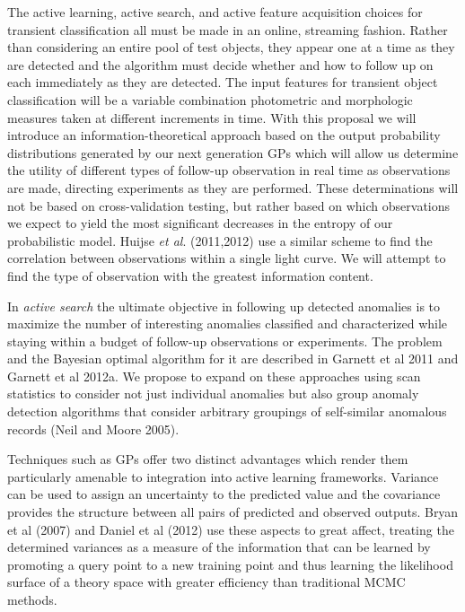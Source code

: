 \documentclass[prd,nofootbib,floatfix,11pt,tightenlines]{revtex4}
\begin{document}
The active learning, active search, and active feature
acquisition choices for transient classification
all must be made in an online, streaming fashion.  
Rather than
considering an entire pool of test objects, they appear one at a time as
they are detected and the algorithm must decide whether and how to follow
up on each immediately as they are detected. 
The input features for transient object classification will be 
a variable combination photometric
and morphologic measures taken at different increments in time. With
this proposal we will  introduce an information-theoretical approach 
based on the output probability distributions generated by our next generation GPs 
which will allow
us determine the utility of different types of follow-up observation
in real time as observations are made,
directing experiments as they are performed.
These determinations will not be based on cross-validation testing,
but rather based on which observations we expect to yield the most significant
decreases in the entropy of our probabilistic model.
Huijse {\it et al}. (2011,2012) use a similar scheme to find the correlation
between observations within a single light curve.  We will attempt to find
the type of observation with the greatest information content. 

In {\it active search} the ultimate objective in following up detected
anomalies is to maximize the number of interesting anomalies
classified and characterized while staying within a budget of
follow-up observations or experiments. The problem and the Bayesian
optimal algorithm for it are described in Garnett et al 2011 and Garnett
et al 2012a. We propose to expand on these approaches using scan
statistics to consider not just individual anomalies but also group
anomaly detection algorithms that consider arbitrary groupings of
self-similar anomalous records (Neil and Moore 2005).


Techniques such as GPs offer
two distinct advantages which render them particularly amenable to
integration into active learning frameworks.  Variance can be used
to assign an uncertainty to the predicted value and the covariance
provides the structure between all pairs of predicted and observed
outputs.  Bryan {et al} (2007) and Daniel {et al} (2012) use these
aspects to great affect, treating the determined variances as a
measure of the information that can be learned by promoting a query
point to a new training point and thus learning the likelihood surface
of a theory space with greater efficiency than traditional MCMC
methods.
\end{document}
